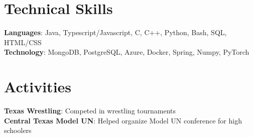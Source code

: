 \documentclass[letterpaper,11pt]{article}
\begin{document}
%
\section{Technical Skills}
 \begin{itemize}[leftmargin=0.15in, label={}]
    \small{\item{
     \textbf{Languages}{: Java, Typescript/Javascript, C, C++, Python, Bash, SQL, HTML/CSS} \\
     \textbf{Technology}{: MongoDB, PostgreSQL, Azure, Docker, Spring, Numpy, PyTorch} \\
    }}
 \end{itemize}

\section{Activities}
 \begin{itemize}[leftmargin=0.15in, label={}]
    \small{\item{
     \textbf{Texas Wrestling}{: Competed in wrestling tournaments} \\
     \textbf{Central Texas Model UN}{: Helped organize Model UN conference for high schoolers} \\
    }}
 \end{itemize}


\end{document}
